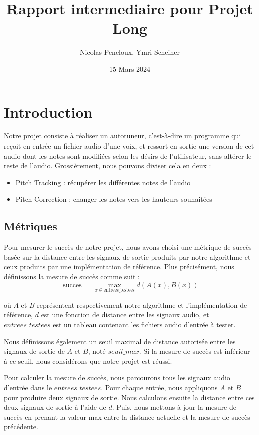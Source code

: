 \documentclass{article}
\title{Rapport intermediaire pour Projet Long}
\author{Nicolas Peneloux, Ymri Scheiner}
\date{15 Mars 2024}
\begin{document}
\maketitle

\section{Introduction}

Notre projet consiste à réaliser un autotuneur, c'est-à-dire un programme qui reçoit en entrée un fichier audio d'une voix, et ressort en sortie une version de cet audio dont les notes sont modifiées selon les désirs de l'utilisateur, sans altérer le reste de l'audio. Grossièrement, nous pouvons diviser cela en deux :
\begin{itemize}
  \item Pitch Tracking : récupérer les différentes notes de l'audio
  \item Pitch Correction : changer les notes vers les hauteurs souhaitées
\end{itemize}
\par 

\subsection*{Métriques}
Pour mesurer le succès de notre projet, nous avons choisi une métrique de succès basée sur la distance entre les signaux de sortie produits par notre algorithme et ceux produits par une 
implémentation de référence. Plus précisément, nous définissons la mesure de succès comme suit :
\begin{equation}
    \operatorname{succes} = \max_{x \in \mathrm{entrees\_testees}} d(A(x), B(x))
\end{equation}
\par

où \( \mathit{A} \) et \( \mathit{B} \) représentent respectivement notre algorithme et l'implémentation de référence, \(\textit{d}\) est une fonction de distance entre les signaux audio, et \(\mathit{entrees\_testees}\) est un tableau contenant les fichiers audio d'entrée à tester.
\par
Nous définissons également un seuil maximal de distance autorisée entre les signaux de sortie de \(\textit{A}\) et \(\textit{B}\), noté \(\textit{seuil\_max}\). Si la mesure de succès est inférieur
à ce seuil, nous considérons que notre projet est réussi.

Pour calculer la mesure de succès, nous parcourons tous les signaux audio d'entrée dans le \( \textit{entrees\_testees} \). Pour chaque entrée, nous appliquons \( \textit{A} \) et \( \textit{B} \) pour produire deux signaux de sortie. Nous calculons ensuite la distance entre ces deux signaux de sortie à l'aide de \( \textit{d} \). Puis, nous mettons à jour la mesure de succès en prenant la valeur max entre la distance actuelle et la mesure de succès précédente.
\end{document}
